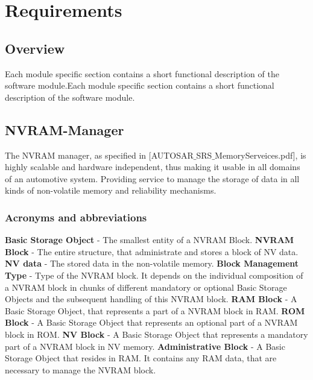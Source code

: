 \newcommand{\FR}{BSW}

\section{Requirements}
\subsection{Overview}Each module specific section contains a short functional description of the software module.Each module specific section contains a short functional description of the software module.

\subsection{NVRAM-Manager}
The \mbox{NVRAM} manager, as specified in [AUTOSAR$\_$SRS$\_$MemoryServeices.pdf], is highly scalable and hardware independent, thus making it usable in all domains of an automotive system. Providing service to manage the storage of data in all kinds of non-volatile memory and reliability mechanisms.

\subsubsection{Acronyms and abbreviations}
{\bf Basic Storage Object} - The smallest entity of a NVRAM Block.\newline
\newline 
{\bf NVRAM Block} - The entire structure, that administrate and stores a block of NV data.\newline
\newline
{\bf NV data} -  The stored data in the non-volatile memory.\newline
\newline
{\bf Block Management Type} - Type of the NVRAM block. It depends on the individual composition of a NVRAM block in chunks of different mandatory or optional Basic Storage Objects and the subsequent handling of this NVRAM block.\newline
\newline
{\bf RAM Block} - A Basic Storage Object, that represents a part of a NVRAM block in RAM.\newline
\newline
{\bf ROM Block} - A Basic Storage Object that represents an optional part of a NVRAM block in ROM.\newline
\newline
{\bf NV Block} -  A Basic Storage Object that represents a mandatory part of a NVRAM block in NV memory.\newline
\newline
{\bf Administrative Block} - A Basic Storage Object that resides in RAM. It contains any RAM data, that are necessary to manage the NVRAM block.

